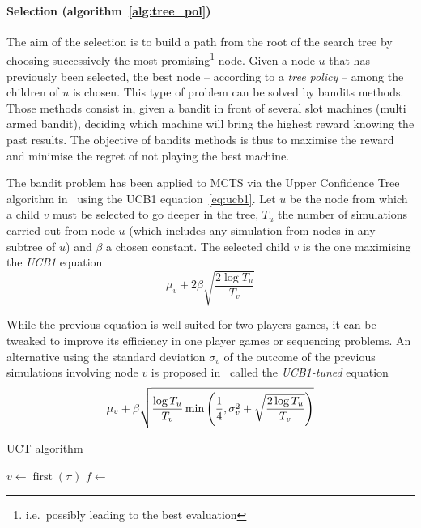 \documentclass[oneside,twocolumn]{article}
\DeclareMathOperator{\argmax}{argmax}
\DeclareMathOperator{\first}{first}
\begin{document}
\paragraph{Selection (algorithm~\ref{alg:tree_pol})}
The aim of the selection is to build a path from the root of the search tree
by choosing successively the most
promising\footnote{i.e.\ possibly leading to the best evaluation} node.
Given a node \(u\) that has previously been selected, the
best node --
according to a \emph{tree policy} -- among the children of \(u\) is
chosen.
This type
of problem can be solved by bandits methods.
Those methods consist in, given a bandit in front of several slot machines
(multi armed bandit), deciding which machine will bring the highest reward
knowing
the past results. The objective of bandits methods is thus to maximise the reward
and minimise the regret of not playing the best machine.

The bandit problem has been applied to MCTS via the Upper Confidence Tree
algorithm in~\cite{kocsis2006bandit} using the UCB1 equation~\ref{eq:ucb1}.
Let \(u\) be the node from which a child \(v\) must be selected to go deeper in
the tree, \(T_u\) the number of simulations carried out from node \(u\)
(which includes any simulation from nodes in any subtree of \(u\)) and
\(\beta\) a chosen constant. The selected child \(v\) is the one maximising the
\emph{UCB1} equation
\begin{equation}
  \label{eq:ucb1}
  \mu_v + 2 \beta \sqrt{\frac{2 \log T_u}{T_v}}
\end{equation}

While the previous equation is well suited for two players games, it can be
tweaked to improve its efficiency in one player games or sequencing problems. An
alternative using the standard deviation \(\sigma_v\) of the outcome of the
previous simulations involving node \(v\) is
proposed in~\cite{sebag2010fuse} called the \emph{UCB1-tuned} equation
\begin{equation}\label{eq:ucb1-tuned}
  \mu_v +
  \beta\sqrt{%
    \frac{\log T_u}{T_v}
    \min\left( \frac{1}{4}, \sigma^2_v +
    \sqrt{%
      \frac{2 \log T_u}{T_v}
    }\right)
  }
\end{equation}
\begin{algorithm}
  \caption{UCT algorithm}\label{alg:tree_pol}
  \begin{algorithmic}
    \State{}\(v \gets \first(\pi)\)
    \State{}\Return{$\pi$}
    \Else{}
    \State{}
    \Else{}
    \State{}$f \gets$ 
    \State{}
    \EndIf{}
    \EndIf{}
    \EndFunction{}
  \end{algorithmic}
  \begin{algorithmic}
    \State{}\Return{$\argmax\{\Call{UCB}{v'} | v' \text{\,children of\,} v \}$}
    \EndFunction{}
  \end{algorithmic}
\end{algorithm}
\end{document}
